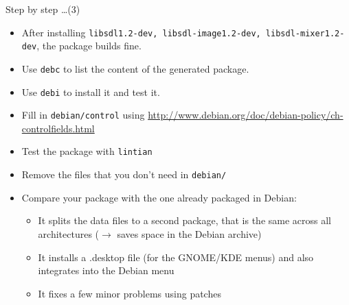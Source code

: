 \documentclass[10pt,final]{beamer}
\begin{document}
\begin{frame}{Step by step \ldots (3)}
\begin{itemize}
	\item After installing \texttt{libsdl1.2-dev, libsdl-image1.2-dev, libsdl-mixer1.2-dev}, the package builds fine.
		\hbr
	\item Use \texttt{debc} to list the content of the generated package.
		\hbr
	\item Use \texttt{debi} to install it and test it.
		\hbr
	\item Fill in \texttt{debian/control} using \url{http://www.debian.org/doc/debian-policy/ch-controlfields.html}
		\hbr
	\item Test the package with \texttt{lintian}
		\hbr
	\item Remove the files that you don't need in \texttt{debian/}
		\hbr
	\item Compare your package with the one already packaged in Debian:
		\begin{itemize}
			\item It splits the data files to a second package, that is the same across all architectures ($\rightarrow$ saves space in the Debian archive)
			\item It installs a .desktop file (for the GNOME/KDE menus) and also integrates into the Debian menu
			\item It fixes a few minor problems using patches
		\end{itemize}
\end{itemize}
\end{frame}
\end{document}
